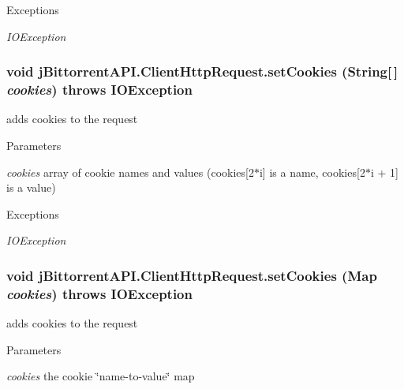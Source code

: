 \begin{DoxyExceptions}{Exceptions}
\item[{\em IOException}]\end{DoxyExceptions}
\hypertarget{classj_bittorrent_a_p_i_1_1_client_http_request_a5855b9145bbf09cf179c0dc69fa89058}{
\subsubsection[{setCookies}]{\setlength{\rightskip}{0pt plus 5cm}void jBittorrentAPI.ClientHttpRequest.setCookies (String\mbox{[}$\,$\mbox{]} {\em cookies})  throws IOException }}
\label{classj_bittorrent_a_p_i_1_1_client_http_request_a5855b9145bbf09cf179c0dc69fa89058}
adds cookies to the request 
\begin{DoxyParams}{Parameters}
\item[{\em cookies}]array of cookie names and values (cookies\mbox{[}2$\ast$i\mbox{]} is a name, cookies\mbox{[}2$\ast$i + 1\mbox{]} is a value) \end{DoxyParams}

\begin{DoxyExceptions}{Exceptions}
\item[{\em IOException}]\end{DoxyExceptions}
\hypertarget{classj_bittorrent_a_p_i_1_1_client_http_request_ae71b15d2913747523158c9e72354e14f}{
\subsubsection[{setCookies}]{\setlength{\rightskip}{0pt plus 5cm}void jBittorrentAPI.ClientHttpRequest.setCookies (Map {\em cookies})  throws IOException }}
\label{classj_bittorrent_a_p_i_1_1_client_http_request_ae71b15d2913747523158c9e72354e14f}
adds cookies to the request 
\begin{DoxyParams}{Parameters}
\item[{\em cookies}]the cookie \char`\"{}name-\/to-\/value\char`\"{} map \end{DoxyParams}

